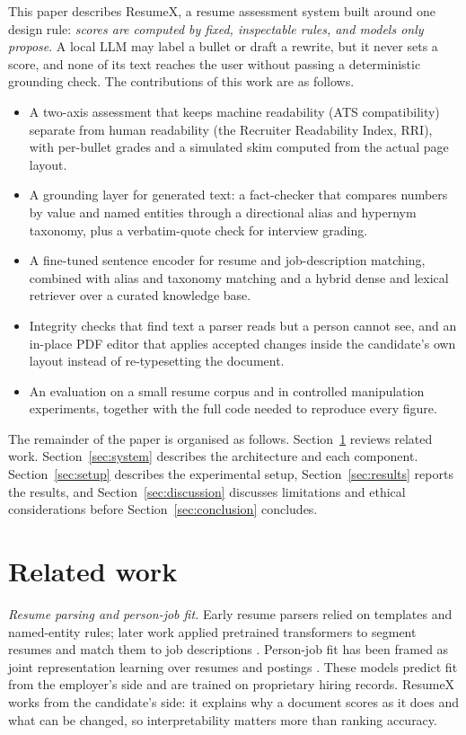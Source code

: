 \documentclass[3p,times,procedia]{elsarticle}
\begin{document}
This paper describes ResumeX, a resume assessment system built around one design rule: \emph{scores are computed by fixed, inspectable rules, and models only propose}. A local LLM may label a bullet or draft a rewrite, but it never sets a score, and none of its text reaches the user without passing a deterministic grounding check. The contributions of this work are as follows.
\begin{itemize}[]
\item A two-axis assessment that keeps machine readability (ATS compatibility) separate from human readability (the Recruiter Readability Index, RRI), with per-bullet grades and a simulated skim computed from the actual page layout.
\item A grounding layer for generated text: a fact-checker that compares numbers by value and named entities through a directional alias and hypernym taxonomy, plus a verbatim-quote check for interview grading.
\item A fine-tuned sentence encoder for resume and job-description matching, combined with alias and taxonomy matching and a hybrid dense and lexical retriever over a curated knowledge base.
\item Integrity checks that find text a parser reads but a person cannot see, and an in-place PDF editor that applies accepted changes inside the candidate's own layout instead of re-typesetting the document.
\item An evaluation on a small resume corpus and in controlled manipulation experiments, together with the full code needed to reproduce every figure.
\end{itemize}

The remainder of the paper is organised as follows. Section~\ref{sec:related} reviews related work. Section~\ref{sec:system} describes the architecture and each component. Section~\ref{sec:setup} describes the experimental setup, Section~\ref{sec:results} reports the results, and Section~\ref{sec:discussion} discusses limitations and ethical considerations before Section~\ref{sec:conclusion} concludes.

\section{Related work}
\label{sec:related}

\textit{Resume parsing and person-job fit.} Early resume parsers relied on templates and named-entity rules; later work applied pretrained transformers to segment resumes and match them to job descriptions \cite{bhatia2019}. Person-job fit has been framed as joint representation learning over resumes and postings \cite{zhu2018pjfnn,qin2018apjfnn}. These models predict fit from the employer's side and are trained on proprietary hiring records. ResumeX works from the candidate's side: it explains why a document scores as it does and what can be changed, so interpretability matters more than ranking accuracy.
\end{document}
